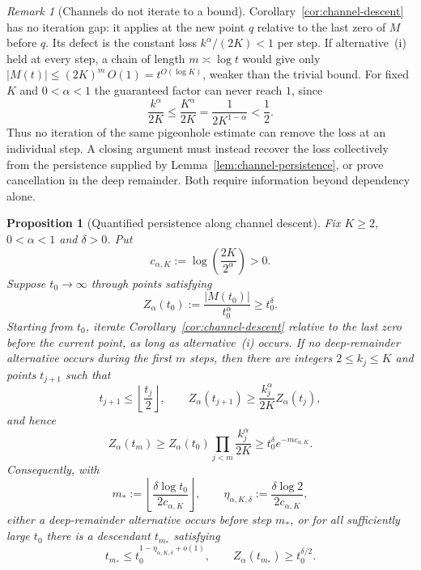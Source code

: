 \documentclass[11pt]{amsart}
\numberwithin{equation}{section}
\theoremstyle{plain}
\newtheorem{proposition}[theorem]{Proposition}
\theoremstyle{definition}
\theoremstyle{remark}
\newtheorem{remark}[theorem]{Remark}
\begin{document}
\begin{remark}[Channels do not iterate to a bound]
\label{rem:channel-loss}
Corollary~\ref{cor:channel-descent} has no iteration gap: it applies at
the new point $q$ relative to the last zero of $M$ before $q$. Its defect
is the constant loss $k^\alpha/(2K)<1$ per step. If alternative~(i) held at
every step, a chain of length $m\asymp\log t$ would give only
$|M(t)|\le(2K)^m\,O(1)=t^{O(\log K)}$, weaker than the trivial bound.
For fixed $K$ and $0<\alpha<1$ the guaranteed factor can never reach
$1$, since
\[
 \frac{k^\alpha}{2K}\le\frac{K^\alpha}{2K}
 =\frac1{2K^{1-\alpha}}<\frac12.
\]
Thus no iteration of the same pigeonhole estimate can remove the loss at an
individual step.  A closing argument must instead recover the loss
collectively from the persistence supplied by
Lemma~\ref{lem:channel-persistence}, or prove cancellation in the deep
remainder.  Both require information beyond dependency alone.
\end{remark}



\begin{proposition}[Quantified persistence along channel descent]
\label{prop:quantified-channel-persistence}
Fix $K\ge2$, $0<\alpha<1$ and $\delta>0$.  Put
\[
 c_{\alpha,K}:=\log\!\left(\frac{2K}{2^\alpha}\right)>0.
\]
Suppose $t_0\to\infty$ through points satisfying
\[
 Z_\alpha(t_0):=\frac{|M(t_0)|}{t_0^\alpha}\ge t_0^\delta.
\]
Starting from $t_0$, iterate Corollary~\ref{cor:channel-descent} relative to
the last zero before the current point, as long as alternative~\textup{(i)}
occurs.  If no deep-remainder alternative occurs during the first $m$ steps,
then there are integers $2\le k_j\le K$ and points $t_{j+1}$ such that
\[
 t_{j+1}\le\left\lfloor\frac{t_j}{2}\right\rfloor,
 \qquad
 Z_\alpha(t_{j+1})
 \ge \frac{k_j^\alpha}{2K}Z_\alpha(t_j),
\]
and hence
\begin{equation}
\label{eq:channel-product-persistence}
 Z_\alpha(t_m)
 \ge Z_\alpha(t_0)\prod_{j<m}\frac{k_j^\alpha}{2K}
 \ge t_0^\delta e^{-m c_{\alpha,K}}.
\end{equation}
Consequently, with
\[
 m_*:=\left\lfloor\frac{\delta\log t_0}{2c_{\alpha,K}}\right\rfloor,
 \qquad
 \eta_{\alpha,K,\delta}:=
 \frac{\delta\log2}{2c_{\alpha,K}},
\]
either a deep-remainder alternative occurs before step $m_*$, or for all
sufficiently large $t_0$ there is a descendant $t_{m_*}$ satisfying
\[
 t_{m_*}\le t_0^{1-\eta_{\alpha,K,\delta}+o(1)},
 \qquad
 Z_\alpha(t_{m_*})\ge t_0^{\delta/2}.
\]
\end{proposition}
\end{document}
